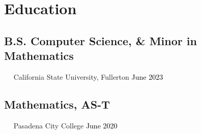 \documentclass{article}
\newcommand{\resumesection}[3]{
    \subsection*{#1}
    \ 
    \ 
    \small
    \textcolor{csufgrey}{#2}
    \normalsize
    \hfill
    \textcolor{black}{#3}
    \normalsize
}
\begin{document}
\pagestyle{useheader}

\section*{Education}
\resumesection{B.S. Computer Science, \& Minor in Mathematics}{California State University, Fullerton}{June 2023}%
\resumesection{Mathematics, AS-T}{Pasadena City College}{June 2020}
\end{document}

